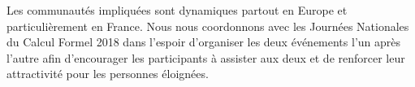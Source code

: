 \documentclass[12pt]{amsbook}
\begin{document}
Les communautés impliquées sont dynamiques partout en Europe et particulièrement en France. Nous nous coordonnons avec les Journées Nationales du Calcul Formel 2018 dans l'espoir d'organiser les deux événements l'un après l'autre afin d'encourager les participants à assister aux deux et de renforcer leur attractivité pour les personnes éloignées.
\end{document}
